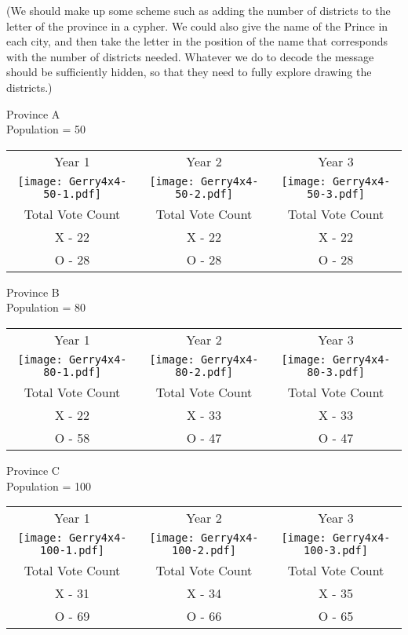 \documentclass{article}
\begin{document}
\begin{flushleft}
(We should make up some scheme such as adding the number of districts to the letter of the province in a cypher. We could also give the name of the Prince in each city, and then take the letter in the position of the name that corresponds with the number of districts needed. Whatever we do to decode the message should be sufficiently hidden, so that they need to fully explore drawing the districts.)

\newpage
Province A \\
Population = 50
\begin{tabular}{c c c }

Year 1 & Year 2 & Year 3 \\
 \texttt{[image: Gerry4x4-50-1.pdf]} &  \texttt{[image: Gerry4x4-50-2.pdf]} &  \texttt{[image: Gerry4x4-50-3.pdf]}\\
 Total Vote Count &  Total Vote Count &  Total Vote Count\\
 X - 22 & X - 22 & X  - 22\\
 O - 28 & O - 28 & O - 28
\end{tabular}



Province B\\
Population = 80
\begin{tabular}{c c c }

Year 1 & Year 2 & Year 3 \\
 \texttt{[image: Gerry4x4-80-1.pdf]} &  \texttt{[image: Gerry4x4-80-2.pdf]} &  \texttt{[image: Gerry4x4-80-3.pdf]}\\
 Total Vote Count &  Total Vote Count &  Total Vote Count\\
 X -  22& X - 33 & X  - 33\\
 O - 58 & O - 47 & O - 47
 \end{tabular}


Province C\\
Population = 100
\begin{tabular}{c c c }

Year 1 & Year 2 & Year 3 \\
 \texttt{[image: Gerry4x4-100-1.pdf]} &  \texttt{[image: Gerry4x4-100-2.pdf]} &  \texttt{[image: Gerry4x4-100-3.pdf]}\\
 Total Vote Count &  Total Vote Count &  Total Vote Count\\
 X -  31& X - 34 & X  - 35\\
 O - 69 & O - 66 & O - 65
 \end{tabular}
\newpage



\end{flushleft}
\end{document}
